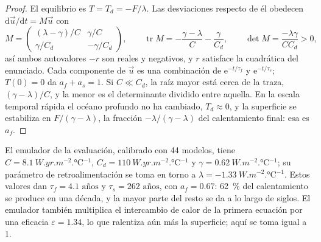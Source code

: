 \begin{proof}
El equilibrio es $T = T_d = -F/\lambda$. Las desviaciones respecto de él obedecen
$\mathrm d\vec u/\mathrm dt = M\vec u$ con
\[
M = \begin{pmatrix} (\lambda - \gamma)/C & \gamma/C\\ \gamma/C_d &
-\gamma/C_d\end{pmatrix}, \qquad
\operatorname{tr}M = -\frac{\gamma - \lambda}{C} - \frac{\gamma}{C_d},
\qquad \det M = \frac{-\lambda\gamma}{CC_d} > 0 ,
\]
así ambos autovalores $-r$ son reales y negativos, y $r$ satisface la cuadrática
del enunciado. Cada componente de $\vec u$ es una combinación de $\mathrm
e^{-t/\tau_f}$ y $\mathrm e^{-t/\tau_s}$; $T(0) = 0$ da $a_f + a_s =
1$. Si $C \ll C_d$, la raíz mayor está cerca de la traza, $(\gamma -
\lambda)/C$, y la menor es el determinante dividido entre aquella. En la escala temporal
rápida el océano profundo no ha cambiado, $T_d \approx 0$, y la superficie
se estabiliza en $F/(\gamma - \lambda)$, la fracción $-\lambda/(\gamma - \lambda)$
del calentamiento final: esa es $a_f$.
\end{proof}

El emulador de la evaluación, calibrado con 44 modelos, tiene $C =
\qty{8.1}{W.yr.m^{-2}.\celsius^{-1}}$, $C_d = \qty{110}{W.yr.m^{-2}.\celsius^{-1}}$
y $\gamma = \qty{0.62}{W.m^{-2}.\celsius^{-1}}$; su parámetro de retroalimentación
se toma en torno a $\lambda = \qty{-1.33}{W.m^{-2}.\celsius^{-1}}$. Estos valores
dan $\tau_f = \num{4.1}\text{ años}$ y $\tau_s = \num{262}\text{ años}$, con $a_f =
0.67$: \qty{62}{\percent} del calentamiento se produce en una década, y la mayor parte del
resto se da a lo largo de siglos. El emulador también multiplica el intercambio de calor de la primera
ecuación por una eficacia $\varepsilon = 1.34$, lo que ralentiza aún más la
superficie; aquí se toma igual a 1.

